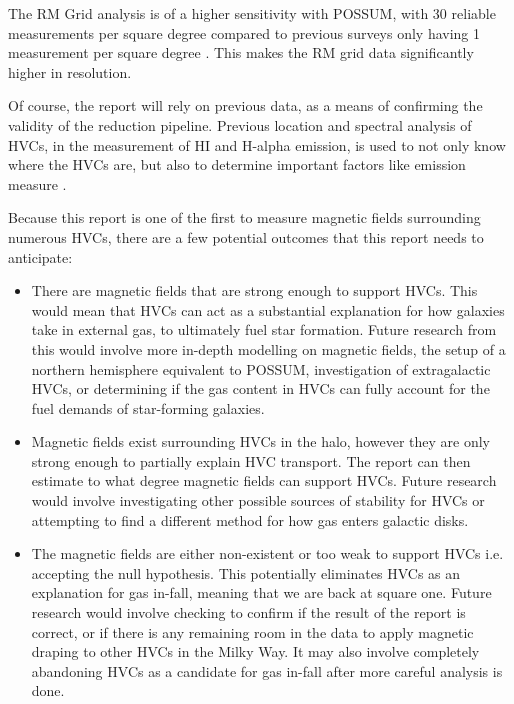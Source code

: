 The RM Grid analysis is of a higher sensitivity with POSSUM, with 30 reliable measurements per square degree compared to previous surveys only having 1 measurement per square degree \cite{ID18, ID1}. This makes the RM grid data significantly higher in resolution.

Of course, the report will rely on previous data, as a means of confirming the validity of the reduction pipeline. Previous location and spectral analysis of HVCs, in the measurement of HI and H-alpha emission, is used to not only know where the HVCs are, but also to determine important factors like emission measure \cite{ID5, ID26, ID30}.

Because this report is one of the first to measure magnetic fields surrounding numerous HVCs, there are a few potential outcomes that this report needs to anticipate:
\begin{itemize}
\item There are magnetic fields that are strong enough to support HVCs. This would mean that HVCs can act as a substantial explanation for how galaxies take in external gas, to ultimately fuel star formation. Future research from this would involve more in-depth modelling on magnetic fields, the setup of a northern hemisphere equivalent to POSSUM, investigation of extragalactic HVCs, or determining if the gas content in HVCs can fully account for the fuel demands of star-forming galaxies.
\item Magnetic fields exist surrounding HVCs in the halo, however they are only strong enough to partially explain HVC transport. The report can then estimate to what degree magnetic fields can support HVCs. Future research would involve investigating other possible sources of stability for HVCs or attempting to find a different method for how gas enters galactic disks.
\item The magnetic fields are either non-existent or too weak to support HVCs i.e. accepting the null hypothesis. This potentially eliminates HVCs as an explanation for gas in-fall, meaning that we are back at square one. Future research would involve checking to confirm if the result of the report is correct, or if there is any remaining room in the data to apply magnetic draping to other HVCs in the Milky Way. It may also involve completely abandoning HVCs as a candidate for gas in-fall after more careful analysis is done.
\end{itemize}